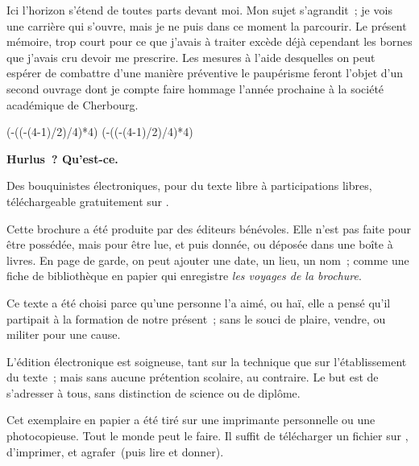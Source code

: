 \documentclass[twoside]{book} %
\def\truncdiv#1#2{((#1-(#2-1)/2)/#2)}
\def\moduloop#1#2{(#1-\truncdiv{#1}{#2}*#2)}
\def\modulo#1#2{\number\numexpr\moduloop{#1}{#2}\relax}
\begin{document}
Ici l’horizon s’étend de toutes parts devant moi. Mon sujet s’agrandit ; je vois une carrière qui s’ouvre, mais je ne puis dans ce moment la parcourir. Le présent mémoire, trop court pour ce que j’avais à traiter excède déjà cependant les bornes que j’avais cru devoir me prescrire. Les mesures à l’aide desquelles on peut espérer de combattre d’une manière préventive le paupérisme feront l’objet d’un second ouvrage dont je compte faire hommage l’année prochaine à la société académique de Cherbourg.
 


\ifbooklet
  \pagestyle{empty}
  \clearpage
  \ifnum\modulo{\value{page}}{4}=0 \hbox{}\newpage\hbox{}\newpage\fi
  \ifnum\modulo{\value{page}}{4}=1 \hbox{}\newpage\hbox{}\newpage\fi


  \hbox{}\newpage
  \ifodd\value{page}\hbox{}\newpage\fi
  {\centering\color{rubric}\bfseries\noindent\large
    Hurlus ? Qu’est-ce.\par
    \bigskip
  }
  \noindent Des bouquinistes électroniques, pour du texte libre à participations libres,
  téléchargeable gratuitement sur \href{https://hurlus.fr}{}.\par
  \bigskip
  \noindent Cette brochure a été produite par des éditeurs bénévoles.
  Elle n’est pas faite pour être possédée, mais pour être lue, et puis donnée, ou déposée dans une boîte à livres.
  En page de garde, on peut ajouter une date, un lieu, un nom ;
  comme une fiche de bibliothèque en papier qui enregistre \emph{les voyages de la brochure}.
  \par

  Ce texte a été choisi parce qu’une personne l’a aimé,
  ou haï, elle a pensé qu’il partipait à la formation de notre présent ;
  sans le souci de plaire, vendre, ou militer pour une cause.
  \par

  L’édition électronique est soigneuse, tant sur la technique
  que sur l’établissement du texte ; mais sans aucune prétention scolaire, au contraire.
  Le but est de s’adresser à tous, sans distinction de science ou de diplôme.
  \par

  Cet exemplaire en papier a été tiré sur une imprimante personnelle
   ou une photocopieuse. Tout le monde peut le faire.
  Il suffit de
  télécharger un fichier sur \href{https://hurlus.fr}{},
  d’imprimer, et agrafer (puis lire et donner).\par
\end{document}
